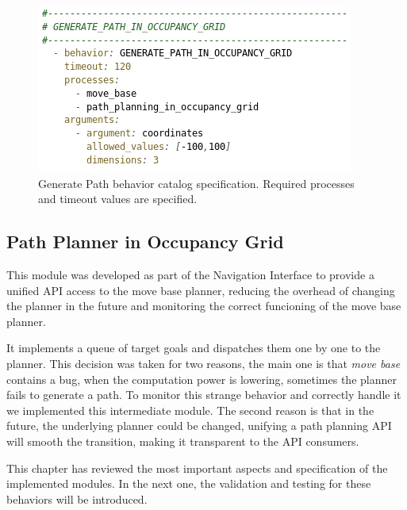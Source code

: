   \begin{figure}
    \centering
    \includegraphics[height=0.19\textheight]{./Figures/BehaviorGPCatalog.png}
    \caption{Generate Path behavior catalog specification. Required processes and timeout values are specified.}
    \label{ch_4:fig:behav_gp_catalog}
  \end{figure}

\subsection{Path Planner in Occupancy Grid} \label{ch_4:subsect:path_planner}

  This module was developed as part of the Navigation Interface to provide a unified API access to the move base planner, reducing the overhead of changing the planner in the future and monitoring the correct funcioning of the move base planner.

  It implements a queue of target goals and dispatches them one by one to the planner. This decision was taken for two reasons, the main one is that \textit{move base} contains a bug, when the computation power is lowering, sometimes the planner fails to generate a path. To monitor this strange behavior and correctly handle it we implemented this intermediate module. The second reason is that in the future, the underlying planner could be changed, unifying a path planning API will smooth the transition, making it transparent to the API consumers.

This chapter has reviewed the most important aspects and specification of the implemented modules. In the next one, the validation and testing for these behaviors will be introduced.

